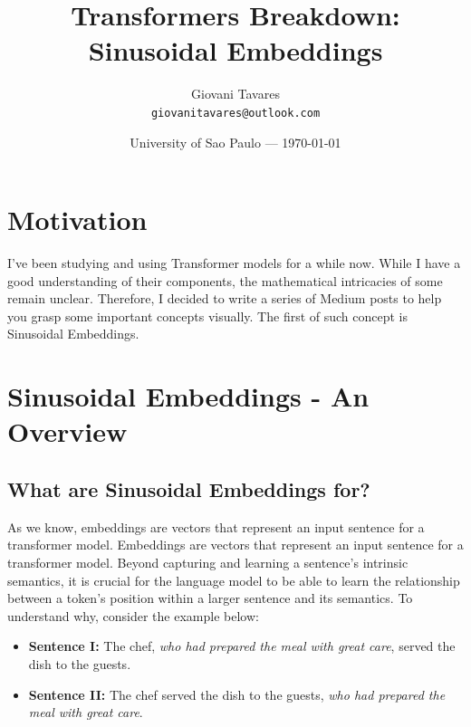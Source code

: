 \documentclass{article}
\title{Transformers Breakdown: Sinusoidal Embeddings} %
\author{Giovani Tavares\\ \texttt{giovanitavares@outlook.com}} %
\date{University of Sao Paulo --- \today} %
\begin{document}
\maketitle %


\section*{Motivation} %

I've been studying and using Transformer models for a while now. While I have a good understanding of their components, the mathematical intricacies of some remain unclear. Therefore, I decided to write a series of Medium posts to help you grasp some important concepts visually. The first of such concept is Sinusoidal Embeddings.



\section{Sinusoidal Embeddings - An Overview}
\subsection{What are Sinusoidal Embeddings for?} %

As we know, embeddings are vectors that represent an input sentence for a transformer model. Embeddings are vectors that represent an input sentence for a transformer model. Beyond capturing and learning a sentence's intrinsic semantics, it is crucial for the language model to be able to learn the relationship between a token's position within a larger sentence and its semantics. To understand why, consider the example below:

\begin{itemize}
	\item \textbf{Sentence I:} The chef, \textit{who had prepared the meal with great care}, served the dish to the guests.
	\item \textbf{Sentence II:} The chef served the dish to the guests, \textit{who had prepared the meal with great care}.
	
\end{itemize}
\end{document}
